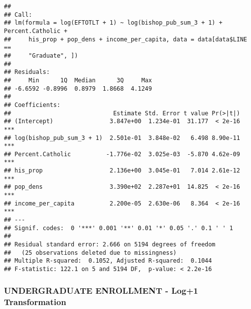 \documentclass[]{article}
\newenvironment{Shaded}{\begin{snugshade}}{\end{snugshade}}
\newcommand{\KeywordTok}[1]{\textcolor[rgb]{0.13,0.29,0.53}{\textbf{#1}}}
\newcommand{\DataTypeTok}[1]{\textcolor[rgb]{0.13,0.29,0.53}{#1}}
\newcommand{\DecValTok}[1]{\textcolor[rgb]{0.00,0.00,0.81}{#1}}
\newcommand{\StringTok}[1]{\textcolor[rgb]{0.31,0.60,0.02}{#1}}
\newcommand{\OperatorTok}[1]{\textcolor[rgb]{0.81,0.36,0.00}{\textbf{#1}}}
\newcommand{\NormalTok}[1]{#1}
\begin{document}
\begin{verbatim}
## 
## Call:
## lm(formula = log(EFTOTLT + 1) ~ log(bishop_pub_sum_3 + 1) + Percent.Catholic + 
##     his_prop + pop_dens + income_per_capita, data = data[data$LINE == 
##     "Graduate", ])
## 
## Residuals:
##     Min      1Q  Median      3Q     Max 
## -6.6592 -0.8996  0.8979  1.8668  4.1249 
## 
## Coefficients:
##                             Estimate Std. Error t value Pr(>|t|)    
## (Intercept)                3.847e+00  1.234e-01  31.177  < 2e-16 ***
## log(bishop_pub_sum_3 + 1)  2.501e-01  3.848e-02   6.498 8.90e-11 ***
## Percent.Catholic          -1.776e-02  3.025e-03  -5.870 4.62e-09 ***
## his_prop                   2.136e+00  3.045e-01   7.014 2.61e-12 ***
## pop_dens                   3.390e+02  2.287e+01  14.825  < 2e-16 ***
## income_per_capita          2.200e-05  2.630e-06   8.364  < 2e-16 ***
## ---
## Signif. codes:  0 '***' 0.001 '**' 0.01 '*' 0.05 '.' 0.1 ' ' 1
## 
## Residual standard error: 2.666 on 5194 degrees of freedom
##   (25 observations deleted due to missingness)
## Multiple R-squared:  0.1052, Adjusted R-squared:  0.1044 
## F-statistic: 122.1 on 5 and 5194 DF,  p-value: < 2.2e-16
\end{verbatim}

\subsubsection{UNDERGRADUATE ENROLLMENT - Log+1
Transformation}\label{undergraduate-enrollment---log1-transformation}

\begin{Shaded}
\end{Shaded}
\end{document}
